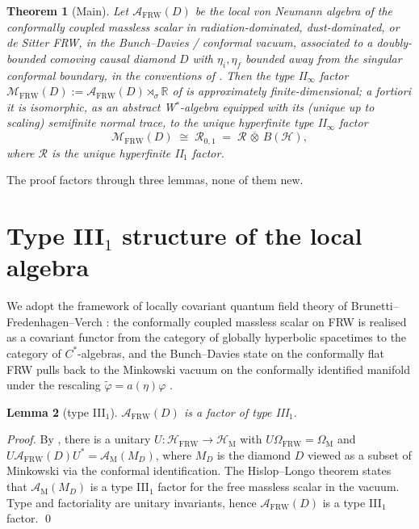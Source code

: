 \documentclass[11pt]{article}
\newtheorem{theorem}{Theorem}
\newtheorem{lemma}[theorem]{Lemma}
\theoremstyle{definition}
\newcommand{\R}{\mathbb{R}}
\newcommand{\HH}{\mathcal{H}}
\renewcommand{\AA}{\mathcal{A}}
\newcommand{\MM}{\mathcal{M}}
\newcommand{\RR}{\mathcal{R}}
\newcommand{\FRW}{\mathrm{FRW}}
\newcommand{\Mink}{\mathrm{M}}
\begin{document}
\begin{theorem}[Main]\label{thm:main}
Let $\AA_\FRW(D)$ be the local von Neumann algebra of the conformally coupled
massless scalar in radiation-dominated, dust-dominated, or de Sitter FRW, in
the Bunch--Davies / conformal vacuum, associated to a doubly-bounded
comoving causal diamond $D$ with $\eta_i, \eta_f$ bounded away from the
singular conformal boundary, in the conventions of \cite{FrwNote2026}. Then
the type II$_\infty$ factor
$\MM_\FRW(D) := \AA_\FRW(D)\rtimes_\sigma \R$
of \cite[Thm.~3.5/3.6]{FrwNote2026} is approximately finite-dimensional;
\emph{a fortiori} it is isomorphic, as an abstract W$^*$-algebra equipped
with its (unique up to scaling) semifinite normal trace, to the unique
hyperfinite type II$_\infty$ factor
\[
\MM_\FRW(D)\;\cong\;\RR_{0,1}\;=\;\RR\,\overline{\otimes}\,B(\HH),
\]
where $\RR$ is the unique hyperfinite II$_1$ factor.
\end{theorem}

The proof factors through three lemmas, none of them new.

\section{Type III$_1$ structure of the local algebra}\label{sec:typeIII1}

We adopt the framework of locally covariant quantum field theory of
Brunetti--Fredenhagen--Verch \cite{BFV2003}: the conformally coupled massless
scalar on FRW is realised as a covariant functor from the category of
globally hyperbolic spacetimes to the category of $C^*$-algebras, and the
Bunch--Davies state on the conformally flat FRW pulls back to the Minkowski
vacuum on the conformally identified manifold under the rescaling
$\tilde\varphi = a(\eta)\varphi$ \cite[\S2.1, \S3]{FrwNote2026}.

\begin{lemma}[type III$_1$]\label{lem:typeIII}
$\AA_\FRW(D)$ is a factor of type III$_1$.
\end{lemma}

\begin{proof}
By \cite[Prop.~3.2 + Thm.~3.5]{FrwNote2026}, there is a unitary
$U:\HH_\FRW \to \HH_\Mink$ with $U\Omega_\FRW = \Omega_\Mink$ and
$U\AA_\FRW(D)U^* = \AA_\Mink(M_D)$, where $M_D$ is the diamond $D$
viewed as a subset of Minkowski via the conformal identification. The
Hislop--Longo theorem \cite{HislopLongo1982} states that $\AA_\Mink(M_D)$
is a type III$_1$ factor for the free massless scalar in the vacuum.
Type and factoriality are unitary invariants, hence $\AA_\FRW(D)$ is a
type III$_1$ factor. \qed
\end{proof}
\end{document}
